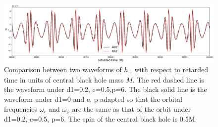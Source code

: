 \documentclass{article}
\begin{document}
\begin{figure}[!htb]
	\centering
	\includegraphics[width=16cm]{krz_kerr_wave.png}
	
	\caption{Comparison between two waveforms of $h_+$ with respect to retarded time in units of central black hole mass $M$. The red dashed line is the waveform under d1=0.2, e=0.5,p=6. The black solid line is the waveform under d1=0 and e, p adapted so that the orbital frequencies $\omega_r$ and $\omega_\phi$ are the same as that of the orbit under d1=0.2, e=0.5, p=6. The spin of the central black hole is 0.5M.}
	\label{range}
\end{figure}	
	
\end{document}
